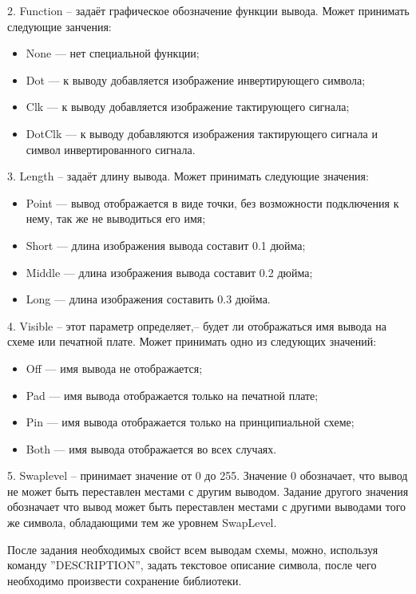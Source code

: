 2. Function -- задаёт графическое обозначение функции вывода. Может принимать
следующие занчения:
\begin{itemize}
	\item{} None --- нет специальной функции;
	\item{} Dot --- к выводу добавляется изображение инвертирующего символа;
	\item{} Clk --- к выводу добавляется изображение тактирующего сигнала;
	\item{} DotClk --- к выводу добавляются изображения тактирующего сигнала и символ
		инвертированного сигнала.
\end{itemize}


3. Length -- задаёт длину вывода. Может принимать следующие значения:
\begin{itemize}
	\item{} Point --- вывод отображается в виде точки, без возможности подключения
		к нему, так же не выводиться его имя;
	\item{} Short  --- длина изображения вывода составит 0.1 дюйма;
	\item{} Middle  --- длина изображения вывода составит 0.2 дюйма;
	\item{} Long --- длина изображения составить 0.3 дюйма.
\end{itemize}

4. Visible -- этот параметр определяет,-- будет ли отображаться имя вывода на схеме
или печатной плате. Может принимать одно из следующих значений:
\begin{itemize}
	\item{} Off  --- имя вывода не отображается;
	\item{} Pad  --- имя вывода отображается только на печатной плате;
	\item{} Pin --- имя вывода отображается только на принципиальной схеме;
	\item{} Both --- имя вывода отображается во всех случаях.
\end{itemize}

5. Swaplevel -- принимает значение от 0 до 255. Значение 0 обозначает, что вывод не может быть
переставлен местами с другим выводом. Задание другого значения обозначает что вывод может
быть переставлен местами с другими выводами того же символа, обладающими тем же уровнем
SwapLevel.

После задания необходимых свойст всем выводам схемы, можно, используя команду
''DESCRIPTION'', задать текстовое описание символа, после чего необходимо произвести сохранение
библиотеки.

